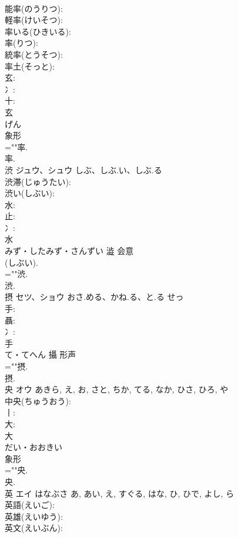 \documentclass[8pt]{extreport}
\begin{document}
\begin{CJK}{UTF8}{min}
\\	能率(のうりつ): 
\\	軽率(けいそつ): 
\\	率いる(ひきいる): 
\\	率(りつ): 
\\	統率(とうそつ): 
\\	率土(そっと): 
\\	玄: 
\\	冫: 
\\	十: 
\\	玄	
\\	げん	
\\	象形 
\\	=""率.
\\	率.
\\	渋	ジュウ、シュウ	しぶ、しぶ.い、しぶ.る		
\\	渋滞(じゅうたい): 
\\	渋い(しぶい): 
\\	水: 
\\	止: 
\\	冫: 
\\	水	
\\	みず・したみず・さんずい	澁	会意 
\\	(しぶい). 
\\	=""渋.
\\	渋.
\\	摂	セツ、ショウ	おさ.める、かね.る、と.る	せっ	
\\	手: 
\\	聶: 
\\	冫: 
\\	手	
\\	て・てへん	攝	形声 
\\	=""摂.
\\	摂.
\\	央	オウ		あきら, え, お, さと, ちか, てる, なか, ひさ, ひろ, や	
\\	中央(ちゅうおう): 
\\	丨: 
\\	大: 
\\	大	
\\	だい・おおきい	
\\	象形 
\\	=""央.
\\	央.
\\	英	エイ	はなぶさ	あ, あい, え, すぐる, はな, ひ, ひで, よし, ら	
\\	英語(えいご): 
\\	英雄(えいゆう): 
\\	英文(えいぶん): 

\end{CJK}
\end{document}
